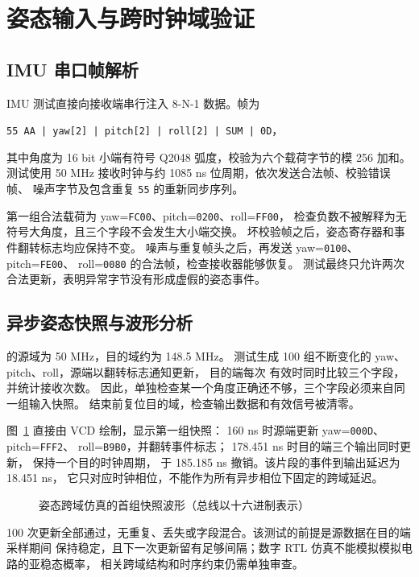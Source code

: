 \section{姿态输入与跨时钟域验证}
\subsection{IMU 串口帧解析}
IMU 测试直接向接收端串行注入 8-N-1 数据。帧为
\begin{center}
\texttt{55 AA | yaw[2] | pitch[2] | roll[2] | SUM | 0D}，
\end{center}
其中角度为 16 bit 小端有符号 Q2048 弧度，校验为六个载荷字节的模 256 加和。
测试使用 50 MHz 接收时钟与约 1085 ns 位周期，依次发送合法帧、校验错误帧、
噪声字节及包含重复 \texttt{55} 的重新同步序列。

第一组合法载荷为 yaw=\texttt{FC00}、pitch=\texttt{0200}、roll=\texttt{FF00}，
检查负数不被解释为无符号大角度，且三个字段不会发生大小端交换。
坏校验帧之后，姿态寄存器和事件翻转标志均应保持不变。
噪声与重复帧头之后，再发送 yaw=\texttt{0100}、pitch=\texttt{FE00}、
roll=\texttt{0080} 的合法帧，检查接收器能够恢复。
测试最终只允许两次合法更新，表明异常字节没有形成虚假的姿态事件。

\subsection{异步姿态快照与波形分析}
 的源域为 50 MHz，目的域约为 148.5 MHz。
测试生成 100 组不断变化的 yaw、pitch、roll，源端以翻转标志通知更新，
目的端每次  有效时同时比较三个字段，并统计接收次数。
因此，单独检查某一个角度正确还不够，三个字段必须来自同一组输入快照。
结束前复位目的域，检查输出数据和有效信号被清零。

图~\ref{fig:sim-cdc} 直接由 VCD 绘制，显示第一组快照：
160 ns 时源端更新 yaw=\texttt{000D}、pitch=\texttt{FFF2}、
roll=\texttt{B9B0}，并翻转事件标志；
178.451 ns 时目的端三个输出同时更新， 保持一个目的时钟周期，
于 185.185 ns 撤销。该片段的事件到输出延迟为 18.451 ns，
它只对应时钟相位，不能作为所有异步相位下固定的跨域延迟。

\begin{figure}[htbp]\centering

\caption{姿态跨域仿真的首组快照波形（总线以十六进制表示）}
\label{fig:sim-cdc}
\end{figure}

100 次更新全部通过，无重复、丢失或字段混合。该测试的前提是源数据在目的端采样期间
保持稳定，且下一次更新留有足够间隔；数字 RTL 仿真不能模拟模拟电路的亚稳态概率，
相关跨域结构和时序约束仍需单独审查。

